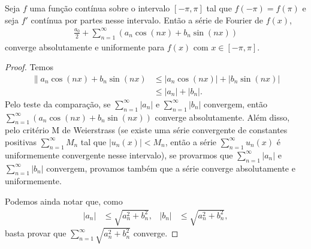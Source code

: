 \begin{teo}
    Seja $f$ uma fun\c{c}\~{a}o cont\'{i}nua sobre o intervalo $[-\pi, \pi]$ tal que $f(-\pi) = f(\pi)$ e seja $f'$ cont\'{i}nua por partes nesse intervalo. Ent\~{a}o a s\'{e}rie de Fourier de $f(x)$,
    \begin{align*}
        \frac{a_0}{2} + \sum_{n = 1}^\infty \left( a_n \cos\left( n x \right) + b_n \sin\left( n x \right) \right)
    \end{align*}
    converge absolutamente e uniformente para $f(x)$ com $x \in [-\pi,\pi]$.
\end{teo}
\begin{proof}
    Temos
    \begin{align*}
        \| a_n \cos\left( n x \right) + b_n \sin\left( n x \right) &\leq | a_n \cos\left( n x \right) | + | b_n \sin\left( n x \right) | \\
        &\leq | a_n | + | b_n |.
    \end{align*}
    Pelo teste da compara\c{c}\~{a}o, se $\sum_{n = 1}^\infty | a_n |$ e $\sum_{n = 1}^\infty | b_n |$ convergem, ent\~{a}o $\sum_{n = 1}^\infty \left( a_n \cos\left( n x \right) + b_n \sin\left( n x \right) \right)$ converge absolutamente. Al\'{e}m disso, pelo crit\'{e}rio M de Weierstrass (se existe uma s\'{e}rie convergente de constantes positivas $\sum_{n = 1}^\infty M_n$ tal que $| u_n(x) | < M_n$, ent\~{a}o a s\'{e}rie $\sum_{n = 1}^\infty u_n(x)$ \'{e} uniformemente convergente nesse intervalo), se provarmos que $\sum_{n = 1}^\infty | a_n |$ e $\sum_{n = 1}^\infty | b_n |$ convergem, provamos tamb\'{e}m que a s\'{e}rie converge absolutamente e uniformemente.

    Podemos ainda notar que, como
    \begin{align*}
        | a_n | &\leq \sqrt{a_n^2 + b_n^2}, & | b_n | &\leq \sqrt{a_n^2 + b_n^2},
    \end{align*}
    basta provar que $\sum_{n = 1}^\infty \sqrt{a_n^2 + b_n^2}$ converge.


\end{proof}
